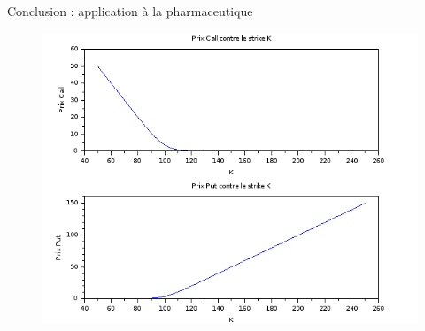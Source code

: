 \documentclass[final]{beamer}
\newlength{\onecolwid}
\begin{document}
\begin{frame}[t]
\begin{columns}[t]
\begin{column}{\onecolwid}
\begin{block}{Conclusion : application à la pharmaceutique}
  \begin{minipage}{1.49\textwidth}
  \begin{figure}[!r]
    \vspace{-11cm}
    \includegraphics[scale=0.9]{callput.png}
  \end{figure}
  \end{minipage}


\end{block}
\end{column}
\end{columns}
\end{frame}
\end{document}
